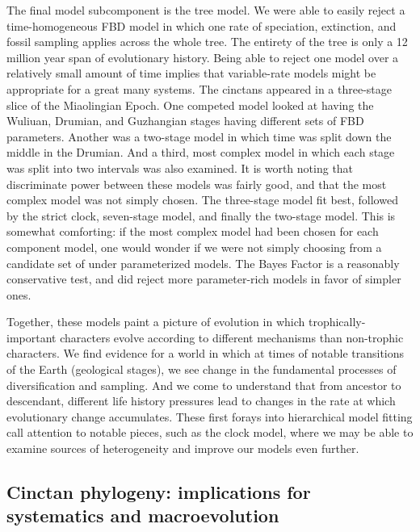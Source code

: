 \documentclass{article}
\begin{document}
The final model subcomponent is the tree model.
We were able to easily reject a time-homogeneous FBD model in which one rate of speciation, extinction, and fossil sampling applies across the whole tree.
The entirety of the tree is only a 12 million year span of evolutionary history.
Being able to reject one model over a relatively small amount of time implies that variable-rate models might be appropriate for a great many systems.
The cinctans appeared in a three-stage slice of the Miaolingian Epoch. 
One competed model looked at having the Wuliuan, Drumian, and Guzhangian stages having different sets of FBD parameters. 
Another was  a two-stage model in which time was split down the middle in the Drumian.
And a third, most complex model in which each stage was split into two intervals was also examined. 
It is worth noting that discriminate power between these models was fairly good, and that the most complex model was not simply chosen.
The three-stage model fit best, followed by the strict clock, seven-stage model, and finally the two-stage model. 
This is somewhat comforting: if the most complex model had been chosen for each component model, one would wonder if we were not simply choosing from a candidate set of under parameterized models. 
The Bayes Factor is a reasonably conservative test, and did reject more parameter-rich models in favor of simpler ones.

Together, these models paint a picture of evolution in which trophically-important characters evolve according to different mechanisms than non-trophic characters.
We find evidence for a world in which at times of notable transitions of the Earth (geological stages), we see change in the fundamental processes of diversification and sampling.
And we come to understand that from ancestor to descendant, different life history pressures lead to changes in the rate at which evolutionary change accumulates. 
These first forays into hierarchical model fitting call attention to notable pieces, such as the clock model, where we may be able to examine sources of heterogeneity and improve our models even further.

\subsection{Cinctan phylogeny: implications for systematics and macroevolution}
\end{document}
